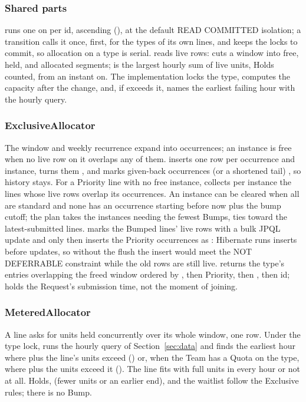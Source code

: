\subsubsection*{Shared parts}
{\sloppy {} runs one  on  per id, ascending (), at the default READ COMMITTED isolation; a transition calls it once, first, for the types of its own lines, and keeps the locks to commit, so allocation on a type is serial.  reads live rows:  cuts a window into free, held, and allocated segments;  is the largest hourly sum of live units, Holds counted, from an instant on. The  implementation locks the type, computes the capacity after the change, and, if  exceeds it, names the earliest failing hour with the hourly query.\par}

\subsubsection*{ExclusiveAllocator}
The window and weekly recurrence expand into occurrences; an instance is free when no live row on it overlaps any of them.  inserts one  row per occurrence and instance,  turns them , and  marks given-back occurrences (or a shortened tail) , so history stays. For a Priority line with no free instance,  collects per instance the lines whose live rows overlap its occurrences. An instance can be cleared when all are standard and none has an occurrence starting before now plus the bump cutoff; the plan takes the instances needing the fewest Bumps, ties toward the latest-submitted lines.  marks the Bumped lines' live rows  with a bulk JPQL update and only then inserts the Priority occurrences as : Hibernate runs inserts before updates, so without the flush the insert would meet the NOT DEFERRABLE constraint while the old rows are still live.  returns the type's entries overlapping the freed window ordered by , then Priority, then , then id;  holds the Request's submission time, not the moment of joining.

\subsubsection*{MeteredAllocator}
A line asks for units held concurrently over its whole window, one  row. Under the type lock,  runs the hourly query of Section~\ref{sec:data} and  finds the earliest hour where  plus the line's units exceed  () or, when the Team has a Quota on the type, where  plus the units exceed it (). The line fits with full units in every hour or not at all. Holds,  (fewer units or an earlier end), and the waitlist follow the Exclusive rules; there is no Bump.

